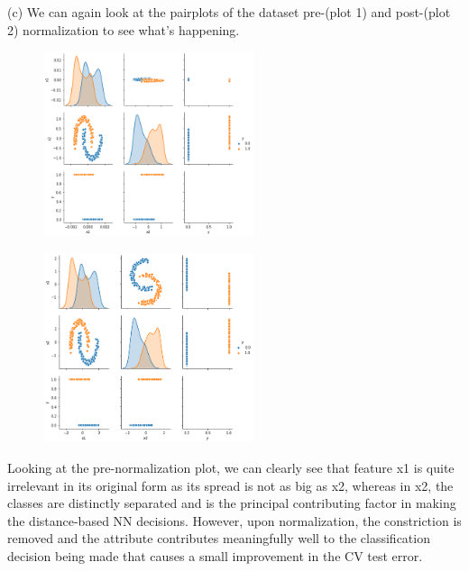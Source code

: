 \documentclass[a4paper]{article}
\theoremstyle{definition}
\newenvironment{soln}{
    \leavevmode\color{blue}\ignorespaces
}{}
\begin{document}
\begin{enumerate}
\begin{soln}
	(c) We can again look at the pairplots of the dataset pre-(plot 1) and post-(plot 2) normalization to see what's happening. 
	
	\begin{figure}[h]
		\centering
		\includegraphics[width=0.55\textwidth]{q9_unnorm.png}  
		\captionsetup{labelformat=empty}
		\caption{}
		\label{fig:my_label}
	\end{figure}
	
	
	\begin{figure}[h]
		\centering
		\includegraphics[width=0.55\textwidth]{q9_norm.png}  
		\captionsetup{labelformat=empty}
		\caption{}
		\label{fig:my_label}
	\end{figure}

	Looking at the pre-normalization plot, we can clearly see that feature x1 is quite irrelevant in its original form as its spread is not as big as x2, whereas in x2, the classes are distinctly separated and is the principal contributing factor in making the distance-based NN decisions. However, upon normalization, the constriction is removed and the attribute contributes meaningfully well to the classification decision being made that causes a small improvement in the CV test error.
	

\end{soln}
\end{enumerate}
\end{document}
